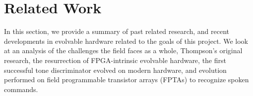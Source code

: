 \documentclass{ieeeaccess}
\newcommand{\highlight}[1]{#1}
\begin{document}

\section{Related Work}\label{sec_related_work}
In this section, we provide a summary of past related research, and recent developments in evolvable hardware related to the goals of this project. We look at \highlight{an analysis of the challenges the field faces as a whole,} Thompson's original research, the resurrection of FPGA-intrinsic evolvable hardware, the first successful tone discriminator evolved on modern hardware, and evolution performed on field programmable transistor arrays (FPTAs) to recognize spoken commands.
\end{document}
